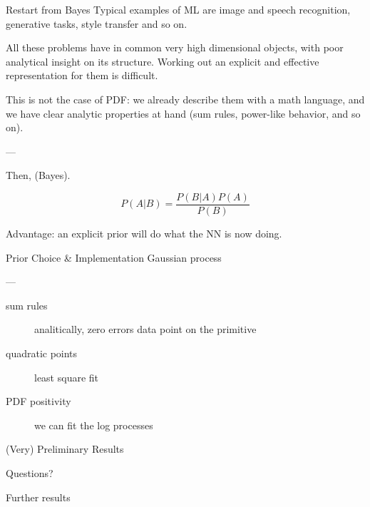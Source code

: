 \documentclass[9pt]{beamer}
\begin{document}
\begin{frame}{Restart from Bayes}
    Typical examples of ML are image and speech recognition, generative tasks,
    style transfer and so on.

    All these problems have in common very high dimensional objects, with poor
    analytical insight on its structure. Working out an explicit and effective
    representation for them is difficult.

    This is not the case of PDF: we already describe them with a math language,
    and we have clear analytic properties at hand (sum rules, power-like
    behavior, and so on).
    
    ---

    Then, (Bayes).

    \begin{equation*}
        P(A|B) = \frac{P(B|A) P(A)}{P(B)}
    \end{equation*}
    
    Advantage: an explicit prior will do what the NN is now doing.
\end{frame}

\begin{frame}{Prior Choice \& Implementation}
    Gaussian process
    
    ---

    \begin{description}
        \item[sum rules] analitically, zero errors data point on the primitive
        \item[quadratic points] least square fit
        \item[PDF positivity] we can fit the log processes
    \end{description}
\end{frame}

\begin{frame}{(Very) Preliminary Results}
\end{frame}

\begin{frame}[standout]
    Questions?
\end{frame}

\appendix

\begin{frame}{Further results}
\end{frame}
\end{document}

